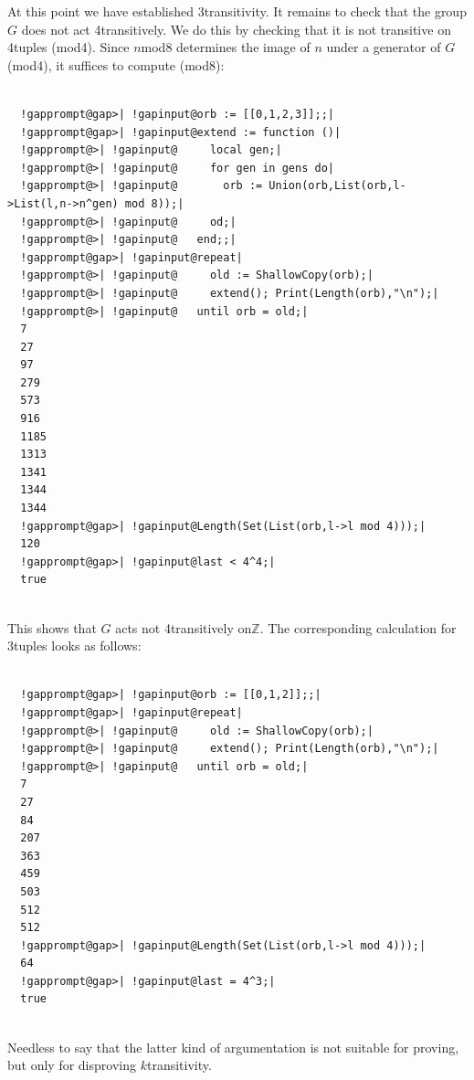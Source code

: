 \documentclass[a4paper,11pt]{report}
\begin{document}
{{\begin{Verbatim}[commandchars=!@|,fontsize=\small,frame=single,label=Example]
\end{Verbatim}
 At this point we have established 3\texttt{}transitivity. It
remains to check that the group $G$ does not act 4\texttt{}transitively. We do this by checking that it
is not transitive on 4\texttt{}tuples (mod{\nobreakspace}4). Since $n${\nobreakspace}mod{\nobreakspace}8 determines the image of $n$ under a generator of $G$ (mod{\nobreakspace}4), it suffices to compute (mod{\nobreakspace}8): 
\begin{Verbatim}[commandchars=!@|,fontsize=\small,frame=single,label=Example]
  
  !gapprompt@gap>| !gapinput@orb := [[0,1,2,3]];;|
  !gapprompt@gap>| !gapinput@extend := function ()|
  !gapprompt@>| !gapinput@     local gen;|
  !gapprompt@>| !gapinput@     for gen in gens do|
  !gapprompt@>| !gapinput@       orb := Union(orb,List(orb,l->List(l,n->n^gen) mod 8));|
  !gapprompt@>| !gapinput@     od;|
  !gapprompt@>| !gapinput@   end;;|
  !gapprompt@gap>| !gapinput@repeat|
  !gapprompt@>| !gapinput@     old := ShallowCopy(orb);|
  !gapprompt@>| !gapinput@     extend(); Print(Length(orb),"\n");|
  !gapprompt@>| !gapinput@   until orb = old;|
  7
  27
  97
  279
  573
  916
  1185
  1313
  1341
  1344
  1344
  !gapprompt@gap>| !gapinput@Length(Set(List(orb,l->l mod 4)));|
  120
  !gapprompt@gap>| !gapinput@last < 4^4;|
  true
  
\end{Verbatim}
 This shows that $G$ acts not 4\texttt{}transitively
on{\nobreakspace}{\ensuremath{\mathbb Z}}. The corresponding calculation for
3\texttt{}tuples looks as follows: 
\begin{Verbatim}[commandchars=!@|,fontsize=\small,frame=single,label=Example]
  
  !gapprompt@gap>| !gapinput@orb := [[0,1,2]];;|
  !gapprompt@gap>| !gapinput@repeat|
  !gapprompt@>| !gapinput@     old := ShallowCopy(orb);|
  !gapprompt@>| !gapinput@     extend(); Print(Length(orb),"\n");|
  !gapprompt@>| !gapinput@   until orb = old;|
  7
  27
  84
  207
  363
  459
  503
  512
  512
  !gapprompt@gap>| !gapinput@Length(Set(List(orb,l->l mod 4)));|
  64
  !gapprompt@gap>| !gapinput@last = 4^3;|
  true
  
\end{Verbatim}
 Needless to say that the latter kind of argumentation is not suitable for
proving, but only for disproving $k$\texttt{}transitivity. }

  
}
\end{document}

